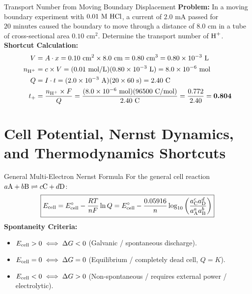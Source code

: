 \documentclass[11pt,a4paper]{report}
\newcommand{\ans}[1]{\ifmmode\bm{#1}\else\textbf{#1}\fi}
\begin{document}
\begin{microbox}{Transport Number from Moving Boundary Displacement}
\textbf{Problem:} In a moving boundary experiment with $0.01\text{ M }\ce{HCl}$, a current of $2.0\text{ mA}$ passed for $20\text{ minutes}$ caused the boundary to move through a distance of $8.0\text{ cm}$ in a tube of cross-sectional area $0.10\text{ cm}^2$. Determine the transport number of $\ce{H^+}$.\\
\textbf{Shortcut Calculation:}
\begin{align*}
V &= A \cdot x = 0.10\text{ cm}^2 \times 8.0\text{ cm} = 0.80\text{ cm}^3 = 0.80 \times 10^{-3}\text{ L} \\
n_{\ce{H+}} &= c \times V = (0.01\text{ mol/L})(0.80 \times 10^{-3}\text{ L}) = 8.0 \times 10^{-6}\text{ mol} \\
Q &= I \cdot t = (2.0 \times 10^{-3}\text{ A})(20 \times 60\text{ s}) = 2.40\text{ C} \\
t_+ &= \frac{n_{\ce{H+}} \times F}{Q} = \frac{(8.0 \times 10^{-6}\text{ mol})(96500\text{ C/mol})}{2.40\text{ C}} = \frac{0.772}{2.40} = \ans{0.804}
\end{align*}
\end{microbox}

\chapter{Cell Potential, Nernst Dynamics, and Thermodynamics Shortcuts}

\begin{shortcutbox}{General Multi-Electron Nernst Formula}
For the general cell reaction $a\ce{A} + b\ce{B} \rightleftharpoons c\ce{C} + d\ce{D}$:
\begin{equation}
\boxed{
E_{\rm cell} = E^\circ_{\rm cell} - \frac{RT}{nF}\ln Q = E^\circ_{\rm cell} - \frac{0.05916}{n}\log_{10}\left(\frac{a_{\ce{C}}^c a_{\ce{D}}^d}{a_{\ce{A}}^a a_{\ce{B}}^b}\right)
}
\end{equation}
\textbf{Spontaneity Criteria:}
\begin{itemize}
    \item $E_{\rm cell} > 0 \iff \Delta G < 0$ (Galvanic / spontaneous discharge).
    \item $E_{\rm cell} = 0 \iff \Delta G = 0$ (Equilibrium / completely dead cell, $Q = K$).
    \item $E_{\rm cell} < 0 \iff \Delta G > 0$ (Non-spontaneous / requires external power / electrolytic).
\end{itemize}
\end{shortcutbox}
\end{document}
